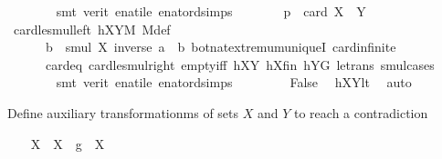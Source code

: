 \begin{isabellebody}
\ \ \ \ \ \ \isamarkupfalse%
\ {\isacharparenleft}{\kern0pt}smt\ {\isacharparenleft}{\kern0pt}verit{\isacharparenright}{\kern0pt}\ enat{\isacharunderscore}{\kern0pt}ile\ enat{\isacharunderscore}{\kern0pt}ord{\isacharunderscore}{\kern0pt}simps{\isacharparenleft}{\kern0pt}{}{\isacharparenright}{\kern0pt}{\isacharparenright}{\kern0pt}\isanewline
\ \ \ \ \isamarkupfalse%
\ \isamarkupfalse%
\ {\isachardoublequoteopen}p\ {\isasymle}\ card\ {\isacharparenleft}{\kern0pt}X\ {\isasymcdots}\ Y{\isacharparenright}{\kern0pt}{\isachardoublequoteclose}\ \isamarkupfalse%
\ card{\isacharunderscore}{\kern0pt}le{\isacharunderscore}{\kern0pt}smul{\isacharunderscore}{\kern0pt}left\ hXYM\ M{\isacharunderscore}{\kern0pt}def\ \isanewline
\ \ \ \ \ \ {\isacartoucheopen}b\ {\isasymin}\ smul\ X\ {\isacharbraceleft}{\kern0pt}inverse\ a\ {\isasymcdot}\ b{\isacharbraceright}{\kern0pt}{\isacartoucheclose}\ bot{\isacharunderscore}{\kern0pt}nat{\isacharunderscore}{\kern0pt}{}{\isachardot}{\kern0pt}extremum{\isacharunderscore}{\kern0pt}uniqueI\ card{\isachardot}{\kern0pt}infinite\ \isanewline
\ \ \ \ \ \ card{\isacharunderscore}{\kern0pt}{}{\isacharunderscore}{\kern0pt}eq\ card{\isacharunderscore}{\kern0pt}le{\isacharunderscore}{\kern0pt}smul{\isacharunderscore}{\kern0pt}right\ empty{\isacharunderscore}{\kern0pt}iff\ hXY\ hXfin\ hYG\ le{\isacharunderscore}{\kern0pt}trans\ smul{\isachardot}{\kern0pt}cases\isanewline
\ \ \ \ \ \ \isamarkupfalse%
\ {\isacharparenleft}{\kern0pt}smt\ {\isacharparenleft}{\kern0pt}verit{\isacharparenright}{\kern0pt}\ enat{\isacharunderscore}{\kern0pt}ile\ enat{\isacharunderscore}{\kern0pt}ord{\isacharunderscore}{\kern0pt}simps{\isacharparenleft}{\kern0pt}{}{\isacharparenright}{\kern0pt}{\isacharparenright}{\kern0pt}\ \isanewline
\ \ \ \ \isamarkupfalse%
\ \isamarkupfalse%
\ False\ \isamarkupfalse%
\ hXYlt\ \isamarkupfalse%
\ auto\isanewline
\ \ \isamarkupfalse%
%
\begin{isamarkuptext}%
Define auxiliary transformationms of sets $X$ and $Y$ to reach a contradiction%
\end{isamarkuptext}\isamarkuptrue%
\ \ \isamarkupfalse%
\ {\isacharquery}{\kern0pt}X{}\ {\isacharequal}{\kern0pt}\ {\isachardoublequoteopen}{\isacharparenleft}{\kern0pt}X\ {\isasymcdots}\ {\isacharbraceleft}{\kern0pt}g{\isacharbraceright}{\kern0pt}{\isacharparenright}{\kern0pt}\ {\isasyminter}\ X{\isachardoublequoteclose}\isanewline

\end{isabellebody}
